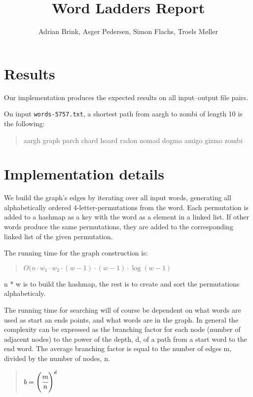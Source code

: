 \documentclass{tufte-handout}
\title{Word Ladders Report}
\author{Adrian Brink, Asger Pedersen, Simon Flachs, Troels Møller}
\begin{document}
  \maketitle

  \section{Results}

  Our implementation produces the expected results on all input--output file pairs.

  On input {\tt words-5757.txt}, a shortest path from aargh to zombi of length 10 is the following:
  \begin{quotation}
    aargh graph parch chard hoard radon nomad dogma amigo gizmo zombi
  \end{quotation}
    
  \section{Implementation details}

  We build the graph's edges by iterating over all input words, generating all alphabetically ordered 4-letter-permutations from the word. Each permutation is added to a hashmap as a key with the word as a element in a linked list. If other words produce the same permutations, they are added to the corresponding linked list of the given permutation.
  
  The running time for the graph construction is:
  
  \begin{quotation}
    $O(n\cdot w_1\cdot w_2\cdot (w-1)\cdot (w-1)\cdot \log(w-1)$ 
  \end{quotation}
  
  n * w is to build the hashmap, the rest is to create and sort the permutations alphabeticaly.
  
  
  The running time for searching will of course be dependent on what words are used as start an ends points, and what words are in the graph.
  In general the complexity can be expressed as the branching factor for each node (number of adjacent nodes) to the power of the depth, d, of a path from a start word to the end word. The average branching factor is equal to the number of edges m, divided by the number of nodes, n. 
  
  \begin{quotation}
    $b=\left(\cfrac{m}{n}\right)^d$
  \end{quotation}
\end{document}
